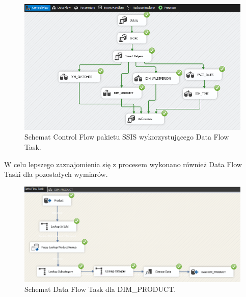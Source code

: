 \documentclass[a4paper,12pt]{article}
\begin{document}
\begin{figure}[H]
    \centering
    \includegraphics[width=\textwidth]{images/5_schema.png}
    \caption{Schemat Control Flow pakietu SSIS wykorzystującego Data Flow Task.}
    \label{fig:zad5_control_flow}
\end{figure}

W celu lepszego zaznajomienia się z procesem wykonano również Data Flow Taski dla pozostałych wymiarów.

\begin{figure}[H]
    \centering
    \includegraphics[width=\textwidth]{images/5_product.png}
    \caption{Schemat Data Flow Task dla DIM\_PRODUCT.}
\end{figure}
\end{document}
